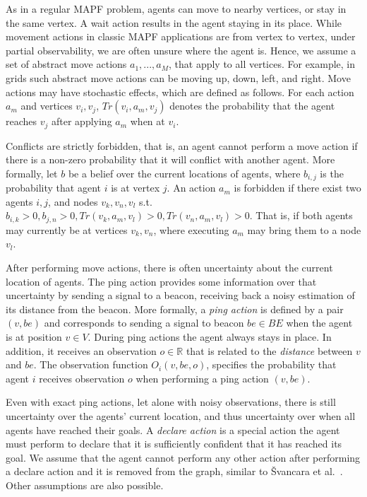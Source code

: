 \documentclass[letterpaper]{article}
\newcommand{\shortcite}[1]{{\cite{#1}}}
\begin{document}
 As in a regular MAPF problem, agents can move to nearby vertices, or stay in the same vertex.
A wait action results in the agent staying in its place.
While movement actions in classic MAPF applications are from vertex to vertex, under partial observability, we are often unsure where the agent is. Hence, we assume a set of abstract move actions $a_1,...,a_M$, that apply to all vertices.
For example, in grids such abstract move actions can be moving up, down, left, and right.
Move actions may have stochastic effects, which are defined as follows.
For each action $a_m$ and vertices $v_i,v_j$, $Tr(v_i,a_m,v_j)$ denotes the probability that the agent reaches $v_j$ after applying $a_m$ when at $v_i$.


Conflicts are strictly forbidden, that is, an agent cannot perform a move action if there is a non-zero probability that it will conflict with another agent.  More formally, let $b$ be a belief over the current locations of agents, where $b_{i,j}$ is the probability that agent $i$ is at vertex $j$.
An action $a_m$ is forbidden if there exist two agents $i,j$, and nodes $v_{k},v_{n},v_{l}$ s.t.
$b_{i,k}>0, b_{j,n}>0, Tr(v_k,a_m,v_l)>0, Tr(v_n,a_m,v_l)>0 $. That is, if both agents may currently be at vertices $v_k,v_n$, where executing $a_m$ may bring them to a node $v_l$.



 After performing move actions, there is often uncertainty about the current location of agents. The ping action provides some information over that uncertainty by sending a signal to a beacon, receiving back a noisy estimation of its distance from the beacon.
More formally, a \emph{ping action} is defined by a pair $(v,be)$ and corresponds to sending a signal to beacon $be\in BE$ when the agent is at position $v\in V$. During ping actions the agent always stays in place.
In addition, it receives an observation $o\in\mathbb{R}$ that is related to the \emph{distance} between $v$ and $be$. The  observation function $O_i(v,be,o)$, specifies the probability that agent $i$ receives observation $o$ when performing a ping action $(v,be)$.

Even with exact ping actions, let alone with noisy observations, there is still uncertainty over the agents' current location, and thus uncertainty over when all agents have reached their goals.
A \emph{declare action} is a special action the agent must perform to declare that it is sufficiently confident that it has reached its goal. We assume that the agent cannot perform any other action after performing a declare action and it is removed from the graph, similar to  {\v{S}}vancara et al.~\shortcite{vsvancara2019online}. Other assumptions are also possible.
\end{document}
